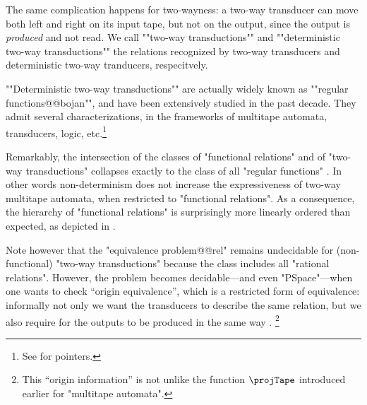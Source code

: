 The same complication happens for two-wayness: a two-way transducer can
move both left and right on its input tape, but not on the output,
since the output is \emph{produced} and not read.
We call \AP""two-way transductions"" and ""deterministic two-way transductions""
the relations recognized by two-way transducers and deterministic two-way tranducers, respecitvely.

""Deterministic two-way transductions"" are actually widely 
known as \AP""regular functions@@bojan"", and have been extensively studied in the past
decade. They admit several characterizations, in the frameworks of multitape automata, transducers, logic, etc.\footnote{See \cite[4th~Paragraph]{Bojanczyk2022Transducers} for pointers.}

Remarkably, the intersection of the classes of "functional relations" and of "two-way transductions"
collapses exactly to the class of all "regular functions" \cite[Theorem 22, p.~243]{EngelfrietHoogeboom2001transduction}.
In other words non-determinism does not increase the expressiveness of two-way multitape automata, when restricted to "functional relations".
As a consequence, the hierarchy of "functional relations" is surprisingly more
linearly ordered than expected, as depicted in .

Note however that the "equivalence problem@@rel" remains undecidable for (non-functional)
"two-way transductions" because the class includes all "rational relations".
However, the problem becomes decidable---and even "PSpace"---when one wants to
check ``origin equivalence'', which is a restricted form of equivalence:
informally not only we want the transducers to describe the same relation, but
we also require for the outputs to be produced in the same way \cite[Theorem~1]{BoseMuschollPuppisPenelle2018OriginEquivalence}.%
\footnote{This ``origin information'' is not unlike the function
$\projTape$ introduced earlier for "multitape automata".}

